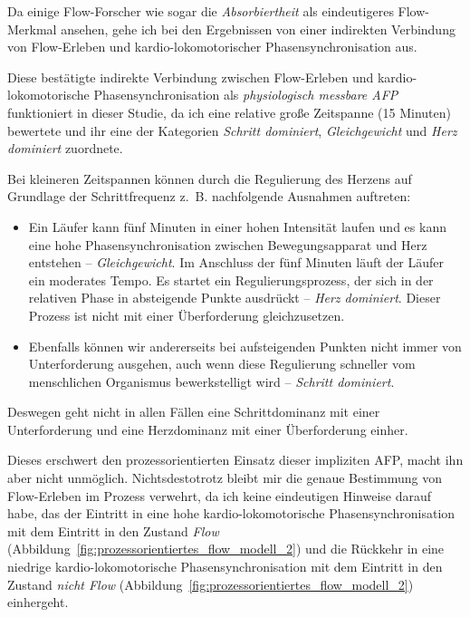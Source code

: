 Da einige Flow-Forscher wie \citet{Peifer2014} sogar die \emph{Absorbiertheit} als eindeutigeres Flow-Merkmal ansehen, gehe ich bei den Ergebnissen von einer indirekten Verbindung von Flow-Erleben und kardio-lokomotorischer Phasensynchronisation aus. 

Diese bestätigte indirekte Verbindung zwischen Flow-Erleben und kardio-lokomotorische Phasensynchronisation als \emph{physiologisch messbare \ac{AFP}} funktioniert in dieser Studie, da ich eine relative große Zeitspanne (15 Minuten) bewertete und ihr eine der Kategorien \emph{Schritt dominiert}, \emph{Gleichgewicht} und \emph{Herz dominiert} zuordnete.

Bei kleineren Zeitspannen können durch die Regulierung des Herzens auf Grundlage der Schrittfrequenz z.~B. nachfolgende Ausnahmen auftreten: 
\begin{itemize}
	
	\item Ein Läufer kann fünf Minuten in einer hohen Intensität laufen und es kann eine hohe Phasensynchronisation zwischen Bewegungsapparat und Herz entstehen -- \emph{Gleichgewicht}. Im Anschluss der fünf Minuten läuft der Läufer ein moderates Tempo. Es startet ein Regulierungsprozess, der sich in der relativen Phase in absteigende Punkte ausdrückt -- \emph{Herz dominiert}. Dieser Prozess ist nicht mit einer Überforderung gleichzusetzen.
	
	\item Ebenfalls können wir andererseits bei aufsteigenden Punkten nicht immer von Unterforderung ausgehen, auch wenn diese Regulierung schneller vom menschlichen Organismus bewerkstelligt wird -- \emph{Schritt dominiert}.
\end{itemize}

Deswegen geht nicht in allen Fällen eine Schrittdominanz mit einer Unterforderung und eine Herzdominanz mit einer Überforderung einher. 

Dieses erschwert den prozessorientierten Einsatz dieser impliziten \ac{AFP}, macht ihn aber nicht unmöglich. Nichtsdestotrotz bleibt mir die genaue Bestimmung von Flow-Erleben im Prozess verwehrt, da ich keine eindeutigen Hinweise darauf habe, das der Eintritt in eine hohe kardio-lokomotorische Phasensynchronisation mit dem Eintritt in den Zustand \emph{Flow} (Abbildung~\ref{fig:prozessorientiertes_flow_modell_2}) und die Rückkehr in eine niedrige kardio-lokomotorische Phasensynchronisation mit dem Eintritt in den Zustand \emph{nicht Flow} (Abbildung~\ref{fig:prozessorientiertes_flow_modell_2}) einhergeht. 


